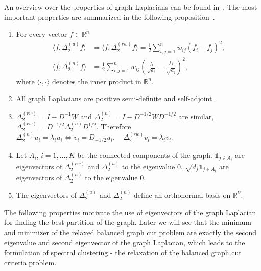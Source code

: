 An overview over the properties of graph Laplacians can be found in~\cite{Luxb07}. The most important properties are summarized in the following proposition~\cite{HeinNotes}.
\begin{proposition}
\begin{enumerate}
\item For every vector $f\in\mathbb{R}^n$ 
\begin{equation*}
\begin{aligned}
\langle f,\Delta_{2}^{(u)}f\rangle &= \langle f,\Delta_{2}^{(rw)}f\rangle= \frac{1}{2}\sum \limits_{i,j=1}^n w_{ij} ( f_i - f_j )^2 ,\\
\langle f,\Delta_{2}^{(n)}f\rangle &= \frac{1}{2}\sum \limits_{i,j=1}^n w_{ij} ( \frac{f_i}{\sqrt{d_i}} - \frac{f_j}{\sqrt{d_j}} )^2,
\end{aligned}
\end{equation*}
where $\langle \cdot,\cdot\rangle$ denotes the inner product in $\mathbb{R}^n$.
\item All graph Laplacians are positive semi-definite and self-adjoint.
\item $\Delta_{2}^{(rw)} = I-D^{-1}W$ and $\Delta_{2}^{(n)} = I-D^{-1/2}WD^{-1/2}$ are similar, $\Delta_{2}^{(rw)} =D^{-1/2}\Delta_{2}^{(n)}D^{1/2}$.
Therefore $\Delta_{2}^{(n)}u_i = \lambda_i u_i \iff v_i = D_{-1/2}u_i,\quad\Delta_{2}^{(rw)} v_i = \lambda_i v_i$.
\item Let $A_i$, $i=1,\dots,K$ be the connected components of the graph. $\mathds{1}_{j \in A_i}$ are eigenvectors of $\Delta_{2}^{(rw)}$ and $\Delta_{2}^{(u)}$ to the eigenvalue 0.
$\sqrt{d_j} \mathds{1}_{j \in A_i}$ are eigenvectors of $\Delta_{2}^{(n)}$ to the eigenvalue 0.
\item The eigenvectors of $\Delta_{2}^{(u)}$ and $\Delta_{2}^{(n)}$ define an orthonormal basis on $\mathbb{R}^V$.
\end{enumerate}
\end{proposition}
% 

The following properties motivate the use of eigenvectors of the graph Laplacian for finding the best partition of the graph. Later we will see that the minimum and minimizer of the relaxed balanced graph cut problem are exactly 
the second eigenvalue and second eigenvector of the graph Laplacian, which leads to the formulation of spectral clustering - the relaxation of the balanced graph cut criteria problem.   

